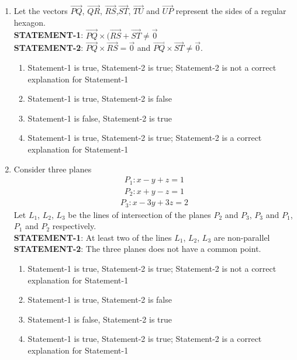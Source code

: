 \begin{enumerate}[label=\arabic*.,ref=\thesubsection.\theenumi]
\item Let the vectors $\overrightarrow{PQ}$, $\overrightarrow{QR}$, $\overrightarrow{RS}$,$\overrightarrow{ST}$, $\overrightarrow{TU}$ and $\overrightarrow{UP}$ represent the sides of a regular hexagon.\\
\textbf{STATEMENT-1}: $\overrightarrow{PQ} \times (\overrightarrow{RS} + \overrightarrow{ST} \neq \overrightarrow{0}$\\
\textbf{STATEMENT-2}: $\overrightarrow{PQ} \times \overrightarrow{RS} = \overrightarrow{0}$ and $\overrightarrow{PQ} \times \overrightarrow{ST} \neq \overrightarrow{0}$.
\begin{enumerate}
\item Statement-1 is true, Statement-2 is true; Statement-2 is not a correct explanation for Statement-1
\item Statement-1 is true, Statement-2 is false
\item Statement-1 is false, Statement-2 is true
\item Statement-1 is true, Statement-2 is true; Statement-2 is a correct explanation for Statement-1
\end{enumerate}

\item Consider three planes
\begin{align*}
P_1: x - y + z = 1
\end{align*}
\begin{align*}
P_2: x + y - z = 1
\end{align*}
\begin{align*}
P_3: x - 3y + 3z = 2
\end{align*}
Let $L_1$, $L_2$, $L_3$ be the lines of intersection of the planes $P_2$ and $P_3$, $P_3$ and $P_1$, $P_1$ and $P_2$ respectively.\\
\textbf{STATEMENT-1}: At least two of the lines $L_1$, $L_2$, $L_3$ are non-parallel\\
\textbf{STATEMENT-2}: The three planes does not have a common point.
\begin{enumerate}
\item Statement-1 is true, Statement-2 is true; Statement-2 is not a correct explanation for Statement-1
\item Statement-1 is true, Statement-2 is false
\item Statement-1 is false, Statement-2 is true
\item Statement-1 is true, Statement-2 is true; Statement-2 is a correct explanation for Statement-1
\end{enumerate}
 

\end{enumerate}
